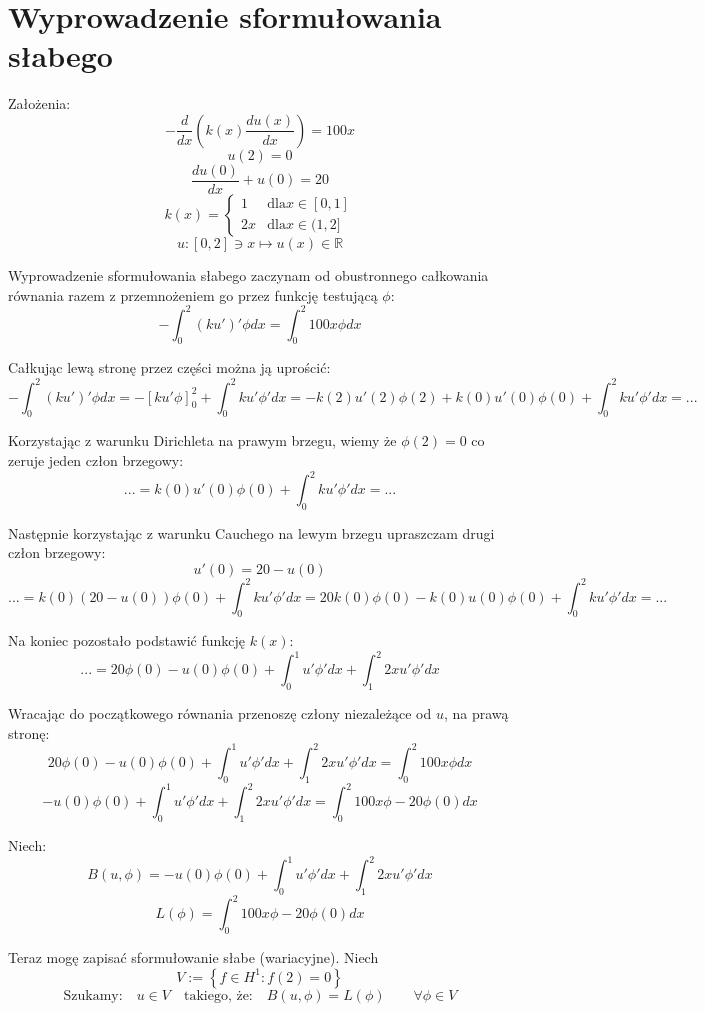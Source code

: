 \documentclass[a4paper]{article}
\begin{document}
\section{Wyprowadzenie sformułowania słabego}
Założenia:
\[-\frac{d}{dx}\left(k(x)\frac{du(x)}{dx}\right) = 100x \]
\[u(2) = 0\]
\[\frac{du(0)}{dx} + u(0) = 20\]
\[k(x) =
 \begin{cases}
    1  & \text{dla} x\in [0,1]\\
    2x & \text{dla} x\in (1,2]
  \end{cases}\]
  \[u: [0,2] \ni x \mapsto u(x) \in \mathbb{R}  \]

  Wyprowadzenie sformułowania słabego zaczynam od obustronnego całkowania równania 
  razem z przemnożeniem go przez funkcję testującą $\phi$:
  \[-\int_{0}^{2}(ku')'\phi dx = \int_{0}^{2}100x\phi dx\]

  Całkując lewą stronę przez części można ją uprościć:
  \[-\int_{0}^{2}(ku')'\phi dx = -\left[ku'\phi\right]_0^2 + \int_{0}^{2}ku'\phi' dx
  = -k(2)u'(2)\phi(2) + k(0)u'(0)\phi(0) + \int_{0}^{2}ku'\phi' dx = ...\]

  Korzystając z warunku Dirichleta na prawym brzegu, wiemy że $\phi(2) = 0$ co zeruje jeden człon brzegowy:
  \[... = k(0)u'(0)\phi(0) + \int_{0}^{2}ku'\phi' dx = ... \]

  Następnie korzystając z warunku Cauchego na lewym brzegu upraszczam drugi człon brzegowy:
  \[u'(0) = 20 - u(0)\]
  \[... = k(0)(20 - u(0))\phi(0) + \int_{0}^{2}ku'\phi' dx = 20k(0)\phi(0) - k(0)u(0)\phi(0) + \int_{0}^{2}ku'\phi' dx = ...\]

  Na koniec pozostało podstawić funkcję $k(x)$:
  \[... = 20\phi(0) - u(0)\phi(0) + \int_{0}^{1}u'\phi' dx + \int_{1}^{2}2xu'\phi' dx\]

  Wracając do początkowego równania przenoszę człony niezależące od $u$, na prawą stronę:
  \[20\phi(0) - u(0)\phi(0) + \int_{0}^{1}u'\phi' dx + \int_{1}^{2}2xu'\phi' dx = \int_{0}^{2}100x\phi dx\]
  \[-u(0)\phi(0) + \int_{0}^{1}u'\phi' dx + \int_{1}^{2}2xu'\phi' dx = \int_{0}^{2}100x\phi -20\phi(0)dx\]

  Niech:
  \[B(u, \phi) = -u(0)\phi(0) + \int_{0}^{1}u'\phi' dx + \int_{1}^{2}2xu'\phi' dx\]
  \[L(\phi) = \int_{0}^{2}100x\phi -20\phi(0)dx\]

  Teraz mogę zapisać sformułowanie słabe (wariacyjne). Niech
  \[ V := \left\{f \in H^1 : f(2) = 0\right\} \]
  \[\text{Szukamy:} \quad u \in V \quad \text{takiego, że:} \quad B(u, \phi) = L(\phi) \qquad \forall \phi \in V \]
  \pagebreak
\end{document}
